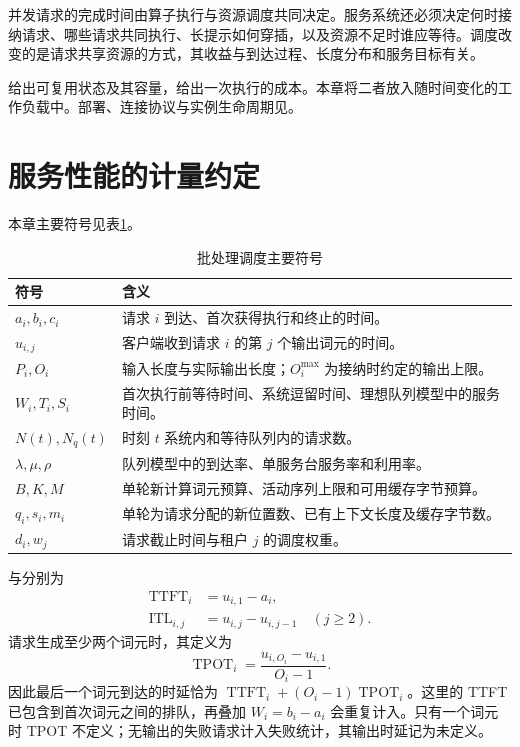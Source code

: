 \documentclass[../textbook.tex]{subfiles}
\begin{document}
\fi
{}

并发请求的完成时间由算子执行与资源调度共同决定。服务系统还必须决定何时接纳请求、哪些请求共同执行、长提示如何穿插，以及资源不足时谁应等待。调度改变的是请求共享资源的方式，其收益与到达过程、长度分布和服务目标有关。

给出可复用状态及其容量，给出一次执行的成本。本章将二者放入随时间变化的工作负载中。部署、连接协议与实例生命周期见。

\section{服务性能的计量约定}

本章主要符号见表\ref{tab:batching-scheduling-symbols}。
\begin{table}[htbp]
\centering
\caption{批处理调度主要符号}\label{tab:batching-scheduling-symbols}
\begin{tabular}{ll}
\toprule
符号 & 含义\\
\midrule
$a_i,b_i,c_i$ & 请求 $i$ 到达、首次获得执行和终止的时间。\\
$u_{i,j}$ & 客户端收到请求 $i$ 的第 $j$ 个输出词元的时间。\\
$P_i,O_i$ & 输入长度与实际输出长度；$O_i^{\max}$ 为接纳时约定的输出上限。\\
$W_i,T_i,S_i$ & 首次执行前等待时间、系统逗留时间、理想队列模型中的服务时间。\\
$N(t),N_q(t)$ & 时刻 $t$ 系统内和等待队列内的请求数。\\
$\lambda,\mu,\rho$ & 队列模型中的到达率、单服务台服务率和利用率。\\
$B,K,M$ & 单轮新计算词元预算、活动序列上限和可用缓存字节预算。\\
$q_i,s_i,m_i$ & 单轮为请求分配的新位置数、已有上下文长度及缓存字节数。\\
$d_i,w_j$ & 请求截止时间与租户 $j$ 的调度权重。\\
\bottomrule
\end{tabular}
\end{table}

与分别为
\begin{equation}
 \begin{aligned}
  \operatorname{TTFT}_i&=u_{i,1}-a_i,\\
  \operatorname{ITL}_{i,j}&=u_{i,j}-u_{i,j-1}\quad(j\ge2).
 \end{aligned}
\end{equation}
请求生成至少两个词元时，其定义为
\begin{equation}
 \operatorname{TPOT}_i=\frac{u_{i,O_i}-u_{i,1}}{O_i-1}.
 \label{eq:schedule-tpot}
\end{equation}
因此最后一个词元到达的时延恰为 $\operatorname{TTFT}_i+(O_i-1)\operatorname{TPOT}_i$。这里的 TTFT 已包含到首次词元之间的排队，再叠加 $W_i=b_i-a_i$ 会重复计入。只有一个词元时 TPOT 不定义；无输出的失败请求计入失败统计，其输出时延记为未定义。
\end{document}
